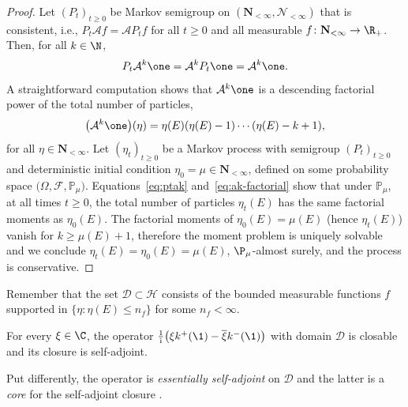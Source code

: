 \begin{proof}
	Let $(P_t)_{t\geq 0}$ be Markov semigroup on $(\mathbf N_{<\infty}, \mathcal N_{<\infty})$ that is consistent, i.e., $P_t \mathcal A f = \mathcal A P_t f$ for all $t\geq 0$ and all measurable $f\colon \mathbf N_{<\infty} \to \R_+$. Then, for all $k\in \N$,
	\begin{equation} \label{eq:ptak}
		P_t \mathcal A^k \one = \mathcal A^k P_t \one = \mathcal A^k \one.
	\end{equation}
	A straightforward computation shows that $\mathcal A^k\one$ is a descending factorial power of the total number of particles,
	\begin{equation} \label{eq:ak-factorial}
		\bigl( \mathcal A^k \one \bigr)(\eta) = \eta(E)( \eta(E)-1) \cdots ( \eta(E) - k +1),
	\end{equation}
	for all $\eta \in \mathbf N_{<\infty}$. Let $(\eta_t)_{t\geq 0}$ be a Markov process with semigroup $(P_t)_{t\geq 0}$ and deterministic initial condition $\eta_0=\mu \in \mathbf N_{<\infty}$, defined on some probability space $\bigl(\Omega,\mathscr F, \mathbb P_\mu\bigr)$. Equations~\eqref{eq:ptak} and~\eqref{eq:ak-factorial} show that under $\mathbb P_\mu$, at all times $t\geq 0$, the total number of particles $\eta_t(E)$ has the same factorial moments as $\eta_0(E)$. The factorial moments of $\eta_0(E) = \mu(E)$ (hence $\eta_t(E)$) vanish for $k\geq \mu(E)+1$, therefore the moment problem is uniquely solvable and we conclude $\eta_t(E) = \eta_0(E) = \mu(E)$, $\P_\mu$-almost surely, and the process is conservative.
\end{proof}

Remember that the set $\mathcal D\subset \mathcal H$ consists of the bounded measurable functions $f$ supported in $\{\eta\colon \eta(E)\leq n_f\}$ for some $n_f<\infty$.

\begin{Lemma} \label{lem:closure}
	For every $\xi \in \C$, the operator $\frac{1}{\mathrm i} \bigl( \xi k^+(\1) - \overline{\xi} k^-(\1)\bigr)$ with domain $\mathcal D$ is closable and its closure is self-adjoint.
\end{Lemma}

Put differently, the operator is \emph{essentially self-adjoint} on $\mathcal D$ and the latter is a \emph{core} for the self-adjoint closure \cite[Section VIII.2]{reedSimonI}.

